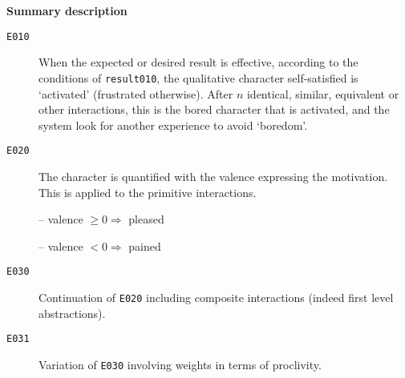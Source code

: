 \bigskip

 \begin{notes}
%

%
%
%
%
%


{\large \textbf{Summary description}}

\begin{description}
\item[\texttt{E010}] 
When the expected or desired result is effective, according to the conditions of \texttt{result010}, the qualitative character self-satisfied is `activated' (frustrated otherwise). After $n$ identical, similar, equivalent or other interactions, this is the bored character that is activated, and the system look for another experience to avoid `boredom'.

\item[\texttt{E020}]
The character is quantified with the valence expressing the motivation. This is applied to the primitive interactions.

\quad -- valence $\geq 0 \Rightarrow$ pleased

\quad -- valence $< 0 \Rightarrow$ pained

\item[\texttt{E030}]
Continuation of \texttt{E020} including composite interactions (indeed first level abstractions).


\item[\texttt{E031}]
Variation of \texttt{E030} involving weights in terms of proclivity.


\end{description}

\end{notes}


